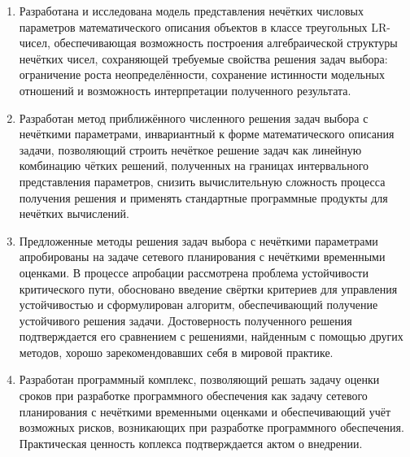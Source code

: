 \begin{enumerate}
  \item Разработана и исследована модель представления нечётких числовых параметров математического описания объектов в классе треугольных LR-чисел, обеспечивающая возможность построения алгебраической структуры нечётких чисел, сохраняющей требуемые свойства решения задач выбора: ограничение роста неопределённости, сохранение истинности модельных отношений и возможность интерпретации полученного результата.
  \item Разработан метод приближённого численного решения задач выбора с нечёткими параметрами, инвариантный к форме математического описания задачи, позволяющий строить нечёткое решение задач как линейную комбинацию чётких решений, полученных на границах интервального представления параметров, снизить вычислительную сложность процесса получения решения и применять стандартные программные продукты для нечётких вычислений.
  \item Предложенные методы решения задач выбора с нечёткими параметрами апробированы на задаче сетевого планирования с нечёткими временными оценками. В процессе апробации рассмотрена проблема устойчивости критического пути, обосновано введение свёртки критериев для управления устойчивостью и сформулирован алгоритм, обеспечивающий получение устойчивого решения задачи. Достоверность полученного решения подтверждается его сравнением с решениями, найденным с помощью других методов, хорошо зарекомендовавших себя в мировой практике.
  \item Разработан программный комплекс, позволяющий решать задачу оценки сроков при разработке программного обеспечения как задачу сетевого планирования с нечёткими временными оценками и обеспечивающий учёт возможных рисков, возникающих при разработке программного обеспечения. Практическая ценность коплекса подтверждается актом о внедрении.   
\end{enumerate}